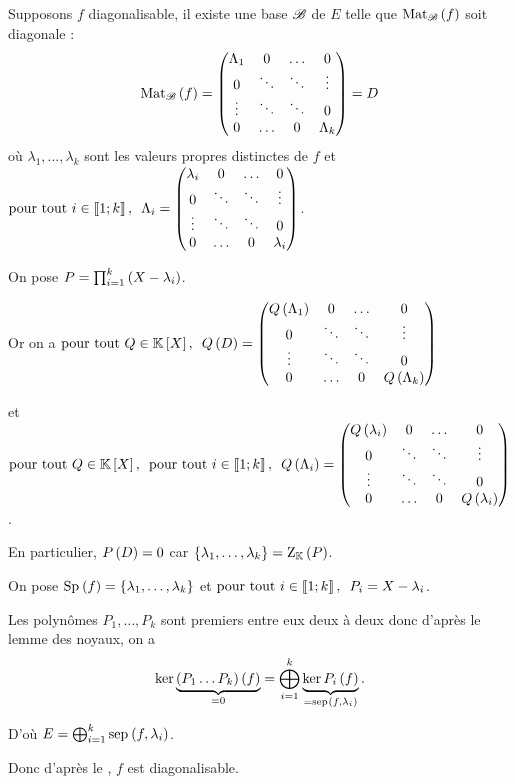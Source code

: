 \begin{dem}[(\(\alpha\)) \(\imp\) (\(\delta\))]
Supposons \(f\) diagonalisable, \ie il existe une base \(\mathscr{B}\) de \(E\) telle que \(\Mat{f}\) soit diagonale : \[\Mat{f}=\begin{pmatrix}
\Lambda_1 & 0 & \dots & 0 \\
0 & \ddots & \ddots & \vdots \\
\vdots & \ddots & \ddots & 0 \\
0 & \dots & 0 & \Lambda_k
\end{pmatrix}=D\] où \(\lambda_1,\dots,\lambda_k\) sont les valeurs propres distinctes de \(f\) et \(\quantifs{\tpt i\in\interventierii{1}{k}}\Lambda_i=\begin{pmatrix}
\lambda_i & 0 & \dots & 0 \\
0 & \ddots & \ddots & \vdots \\
\vdots & \ddots & \ddots & 0 \\
0 & \dots & 0 & \lambda_i
\end{pmatrix}\).

On pose \(P=\prod_{i=1}^k\left(X-\lambda_i\right)\).

Or on a \(\quantifs{\tpt Q\in\poly}Q\paren{D}=\begin{pmatrix}
Q\paren{\Lambda_1} & 0 & \dots & 0 \\
0 & \ddots & \ddots & \vdots \\
\vdots & \ddots & \ddots & 0 \\
0 & \dots & 0 & Q\paren{\Lambda_k}
\end{pmatrix}\)

et \(\quantifs{\tpt Q\in\poly;\tpt i\in\interventierii{1}{k}}Q\paren{\Lambda_i}=\begin{pmatrix}
Q\paren{\lambda_i} & 0 & \dots & 0 \\
0 & \ddots & \ddots & \vdots \\
\vdots & \ddots & \ddots & 0 \\
0 & \dots & 0 & Q\paren{\lambda_i}
\end{pmatrix}\).

En particulier, \(P\left(D\right)=0\) car \(\accol{\lambda_1,\dots,\lambda_k}=\rac{P}\).
\end{dem}

\begin{dem}[(\(\delta\)) \(\imp\) (\(\alpha\))]
On pose \(\Sp{f}=\accol{\lambda_1,\dots,\lambda_k}\) et \(\quantifs{\tpt i\in\interventierii{1}{k}}P_i=X-\lambda_i\).

Les polynômes \(P_1,\dots,P_k\) sont premiers entre eux deux à deux donc d'après le lemme des noyaux, on a \[\ker\underbrace{\paren{P_1\dots P_k}\paren{f}}_{=0}=\bigoplus_{i=1}^k\underbrace{\ker P_i\paren{f}}_{=\sep{f}{\lambda_i}}.\]

D'où \(E=\bigoplus_{i=1}^k\sep{f}{\lambda_i}\).

Donc d'après le , \(f\) est diagonalisable.
\end{dem}

